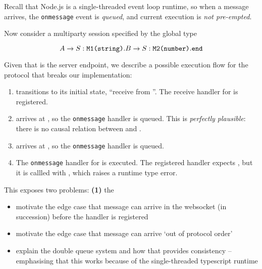 \begin{example}
Recall that Node.js is a single-threaded event loop runtime, so
when a message arrives, 
the \texttt{onmessage} event is \textit{queued},
and current execution is \textit{not pre-empted}.

Now consider a multiparty session specified by the global type

\[ A \to S: \texttt{M1(string)}. B \to S: \texttt{M2(number)}. \texttt{end} \]

Given that  is the server endpoint,
we describe a possible execution flow for the protocol
that breaks our implementation:

\begin{enumerate}
\item 
{} transitions to its initial state, ``receive from ''.
The receive handler for  is registered.

\item
{} arrives at , so the \texttt{onmessage} handler
is queued. This is \textit{perfectly plausible}: there
is no causal relation between  and .

\item
{} arrives at , so the \texttt{onmessage} handler
is queued.

\item
The \texttt{onmessage} handler for  is executed.
The registered handler expects ,
but it is callled with , which raises
a runtime type error.
\end{enumerate}

This exposes two problems: 
\textbf{(1)} the 
\end{example}



\begin{itemize}
\item motivate the edge case that message can arrive in the websocket (in succession) before the handler is registered
\item motivate the edge case that message can arrive `out of protocol order' 
\item explain the double queue system and how that provides consistency -- emphasising that this works because of the single-threaded typescript runtime
\end{itemize}

